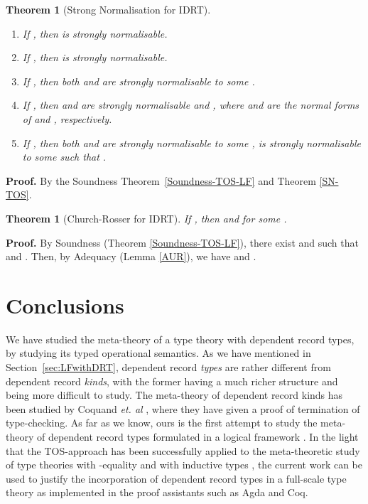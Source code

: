 \documentclass[submission,copyright,creativecommons]{eptcs}
\newtheorem{thm}[definition]{Theorem}
\begin{document}
\begin{thm}[Strong Normalisation for IDRT] \label{SN-LFDRT}\
\begin{enumerate}
  \item If , then  is strongly normalisable.
  \item If , then  is strongly normalisable.
  \item If , then both  and  are strongly normalisable to some .
  \item If , then  and  are strongly normalisable and , where  and  are the normal forms of  and , respectively.
  \item If , then both  and  are strongly normalisable to some ,  is strongly normalisable to some  such that .
\end{enumerate}
\end{thm}
\textbf{Proof.} By the Soundness Theorem~\ref{Soundness-TOS-LF}
and Theorem \ref{SN-TOS}.


\begin{thm}[Church-Rosser for IDRT] \label{CR-LFDRT}
If , then  and  for some .
\end{thm}
\textbf{Proof.} By Soundness (Theorem \ref{Soundness-TOS-LF}), there exist  and  such that  and .  Then, by Adequacy (Lemma \ref{AUR}), we have  and .

\section{Conclusions}
\label{sec:conclusion}

We have studied the meta-theory of a type theory with dependent record types, by studying its typed operational semantics.  As we have mentioned in Section~\ref{sec:LFwithDRT}, dependent record \emph{types} are rather different from dependent record \emph{kinds}, with the former having a much richer structure and being more difficult to study.  The meta-theory of dependent record kinds has been studied by Coquand \emph{et. al} \cite{ctp:semantic-records05}, where they have given a proof of termination of type-checking.  As far as we know, ours is the first attempt to study the meta-theory of dependent record types formulated in a logical framework \cite{Pollack:records02,luo:TYPES08,luo:MLPA09}.  In the light that the TOS-approach has been successfully applied to the meta-theoretic study of type theories with -equality \cite{healf:TLCA99YY} and with inductive types \cite{healf:thesis}, the current work can be used to justify the incorporation of dependent record types in a full-scale type theory as implemented in the proof assistants such as Agda and Coq.
\end{document}
